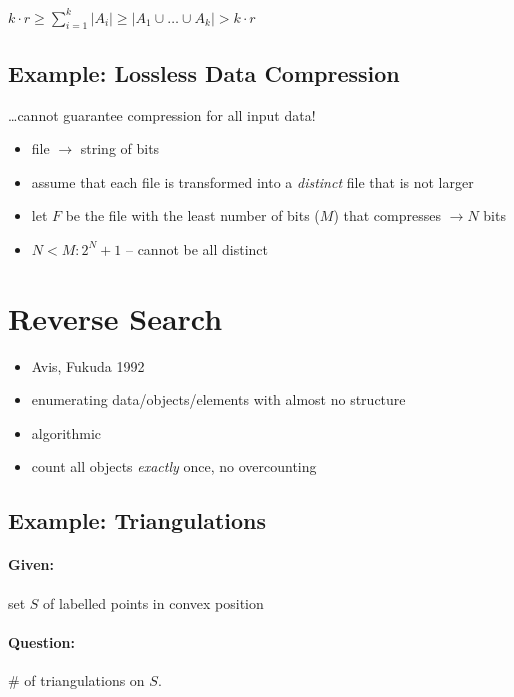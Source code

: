 \documentclass[11pt]{article}
\begin{document}
$ k \cdot r \geq \sum \limits_{i = 1}^k | A_i | \geq | A_1 \cup \dots \cup A_k | > k \cdot r $

\subsection{Example: Lossless Data Compression}

\dots cannot guarantee compression for all input data!

\begin{itemize}
\item file $ \rightarrow $ string of bits
\item assume that each file is transformed into a \textit{distinct} file that is not larger
\item let $ F $ be the file with the least number of bits ($M$) that compresses $\rightarrow N $ bits
\item $ N < M : 2^N + 1 $ – cannot be all distinct
\end{itemize}


\section{Reverse Search}

\begin{itemize}
\item Avis, Fukuda 1992
\item enumerating data/objects/elements with almost no structure
\item algorithmic
\item count all objects \textit{exactly} once, no overcounting
\end{itemize}

\subsection{Example: Triangulations}

\paragraph{Given:} set $ S $ of labelled points in convex position

\paragraph{Question:} \# of triangulations on $ S $.
\end{document}
